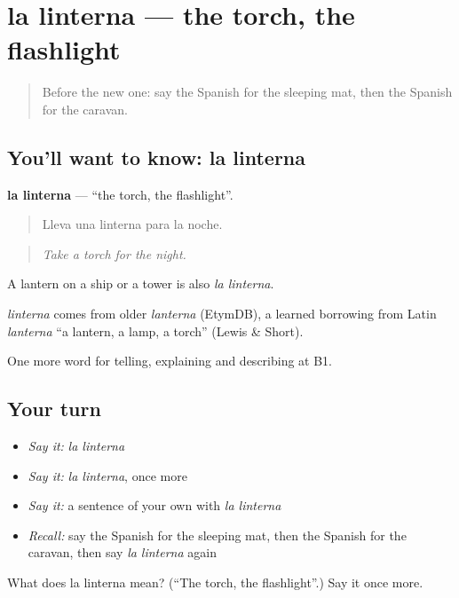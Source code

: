 \section[la linterna]{la linterna — the torch, the flashlight}

\label{lesson:ES-C666-linterna}



\begin{quote}
Before the new one: say the Spanish for the sleeping mat, then the Spanish for the caravan.
\end{quote}

\subsection*{You'll want to know: la linterna}
\textbf{la linterna} — \textquotedblleft{}the torch, the flashlight\textquotedblright{}.

\begin{quote}
Lleva una linterna para la noche.
\end{quote}

\begin{quote}
\emph{Take a torch for the night.}
\end{quote}

A lantern on a ship or a tower is also \emph{la linterna}.

\begin{cousinweb}
\emph{linterna} comes from older \emph{lanterna} (EtymDB), a learned borrowing from Latin \emph{lanterna} \textquotedblleft{}a lantern, a lamp, a torch\textquotedblright{} (Lewis \& Short).
\end{cousinweb}

\begin{grammarlens}[title={What you've built}]
One more word for telling, explaining and describing at B1.
\end{grammarlens}

\subsection*{Your turn}
\begin{itemize}
\raggedright
  \item \emph{Say it:} \emph{la linterna}
  \item \emph{Say it:} \emph{la linterna}, once more
  \item \emph{Say it:} a sentence of your own with \emph{la linterna}
  \item \emph{Recall:} say the Spanish for the sleeping mat, then the Spanish for the caravan, then say \emph{la linterna} again
\end{itemize}

\begin{tcolorbox}[breakable,colback=teal!4,colframe=teal!35!black,title={Before you move on}]
What does la linterna mean? (\textquotedblleft{}The torch, the flashlight\textquotedblright{}.) Say it once more.
\end{tcolorbox}
